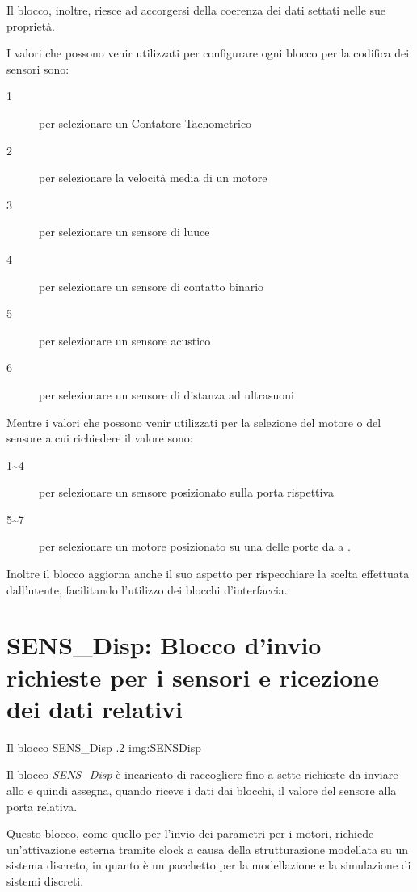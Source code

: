 Il blocco, inoltre, riesce ad accorgersi della coerenza dei dati settati
nelle sue proprietà.

I valori che possono venir utilizzati per configurare ogni blocco per la
codifica dei sensori sono:
\begin{description}
    \item[1] per selezionare un Contatore Tachometrico
    \item[2] per selezionare la velocità media di un motore
    \item[3] per selezionare un sensore di luuce
    \item[4] per selezionare un sensore di contatto binario
    \item[5] per selezionare un sensore acustico
    \item[6] per selezionare un sensore di distanza ad ultrasuoni
\end{description}

Mentre i valori che possono venir utilizzati per la selezione del motore o
del sensore a cui richiedere il valore sono:
\begin{description}
    \item[1\textasciitilde{}4] per selezionare un sensore posizionato sulla
        porta rispettiva
    \item[5\textasciitilde{}7] per selezionare un motore posizionato su una
        delle porte da  a .
\end{description}

Inoltre il blocco aggiorna anche il suo aspetto per rispecchiare la scelta
effettuata dall'utente, facilitando l'utilizzo dei blocchi d'interfaccia.

\section[SENS\_Disp]{SENS\_Disp: Blocco d'invio richieste per i sensori e
ricezione dei dati relativi}
        {Il blocco SENS\_Disp}
        {.2}
        {img:SENSDisp}

Il blocco \emph{SENS\_Disp} è incaricato di raccogliere fino a sette
richieste da inviare allo \SPAM{} e quindi assegna, quando riceve i dati
dai blocchi, il valore del sensore alla porta relativa.

Questo blocco, come quello per l'invio dei parametri per i motori, richiede
un'attivazione esterna tramite clock a causa della strutturazione modellata
su un sistema discreto, in quanto \SciCosLab{} è un pacchetto per la
modellazione e la simulazione di sistemi discreti.

